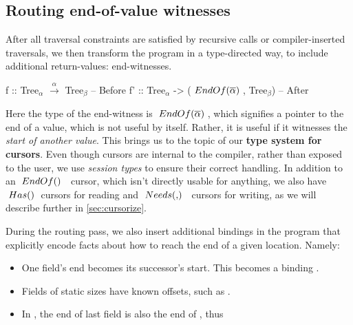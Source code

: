 \documentclass[a4paper,english]{lipics-v2016}
\newcommand{\travarr}[1]{\xrightarrow{#1}}
\newcommand{\fresh}[1]{\ensuremath{#1}}
\newcommand{\freshA}{\fresh{\alpha}}
\newcommand{\freshB}{\fresh{\beta}}
\newcommand{\locend}[1]{\ensuremath{\overline{#1}}}
\begin{document}
\subsection{Routing end-of-value witnesses}
\label{subsec:routing}

After all traversal constraints are satisfied by recursive calls or
compiler-inserted traversals, we then transform the program in a type-directed
way, to include additional return-values: end-witnesses.

\begin{code}
  f  :: Tree$_\freshA$ $\travarr{\freshA}$ Tree$_\freshB$                  -- Before
  f' :: Tree$_\freshA$ -> ($\ENDOF{\locend{\freshA}}$, Tree$_\freshB$) -- After
\end{code}


Here the type of the end-witness is $\ENDOF{\locend{\freshA}}$, which signifies
a pointer to the end of a value, which is not useful by itself.  Rather, it is
useful if it witnesses the {\em start of another value}.
%
This brings us to the topic of our {\bf type system for cursors}.  Even though
cursors are internal to the compiler, rather than exposed to the user, we use 
{\em session types} to ensure their correct handling.  In addition to an
$\ENDOF$ cursor, which isn't directly usable for anything, we also have
$\; Has() \;$ cursors for reading and $\NEEDS{}$ cursors for writing, as we will
describe further in \cref{sec:cursorize}.

During the routing pass, we also insert additional bindings in the program that
explicitly encode facts about how to reach the end of a given location.  Namely:

\begin{itemize}
\item One field's end becomes its successor's start.  This becomes a
  binding .
\item Fields of static sizes have known offsets, such as .  
\item In , the end of last field  is
  also the end of , thus \\ 
\end{itemize}
\end{document}
